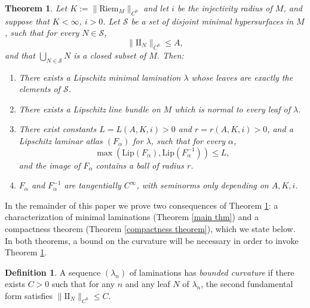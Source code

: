 \documentclass[reqno,11pt]{amsart}
\newcommand{\Two}{\mathrm{I\!I}}
\newcommand{\Lip}{\mathrm{Lip}}
\newcommand{\Riem}{\mathrm{Riem}}
\newcommand{\dfn}[1]{\emph{#1}\index{#1}}
\newtheorem{mainthm}{Theorem}
\theoremstyle{definition}
\newtheorem{definition}[theorem]{Definition}
\numberwithin{equation}{section}
\begin{document}
\begin{mainthm}\label{regularity theorem}
Let $K := \|\Riem_M\|_{C^0}$ and let $i$ be the injectivity radius of $M$, and suppose that $K < \infty$, $i > 0$.
Let $\mathcal S$ be a set of disjoint minimal hypersurfaces in $M$, such that for every $N \in \mathcal S$,
\begin{equation}\label{curvature bound in regularity}
	\|\Two_N\|_{C^0} \leq A,
\end{equation}
and that $\bigcup_{N \in \mathcal S} N$ is a closed subset of $M$. Then:
\begin{enumerate}
\item There exists a Lipschitz minimal lamination $\lambda$ whose leaves are exactly the elements of $\mathcal S$.
\item There exists a Lipschitz line bundle on $M$ which is normal to every leaf of $\lambda$.
\item There exist constants $L = L(A, K, i) > 0$ and $r = r(A, K, i) > 0$, and a Lipschitz laminar atlas $(F_\alpha)$ for $\lambda$, such that for every $\alpha$,
\begin{equation}\label{conorm of flow box}
	\max(\Lip(F_\alpha), \Lip(F_\alpha^{-1})) \leq L,
\end{equation}
and the image of $F_\alpha$ contains a ball of radius $r$.
\item $F_\alpha$ and $F_\alpha^{-1}$ are tangentially $C^\infty$, with seminorms only depending on $A, K, i$.
\end{enumerate}
\end{mainthm}

In the remainder of this paper we prove two consequences of Theorem \ref{regularity theorem}: a characterization of minimal laminations (Theorem \ref{main thm}) and a compactness theorem (Theorem \ref{compactness theorem}), which we state below.
In both theorems, a bound on the curvature will be necessary in order to invoke Theorem \ref{regularity theorem}.

\begin{definition}
A sequence $(\lambda_n)$ of laminations has \dfn{bounded curvature} if there exists $C > 0$ such that for any $n$ and any leaf $N$ of $\lambda_n$, the second fundamental form satisfies $\|\Two_N\|_{C^0} \leq C$.
\end{definition}
\end{document}
